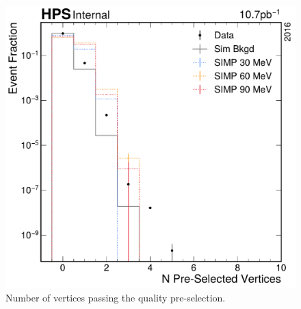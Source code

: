\begin{figure}
  \centering
  \includegraphics[width=\textwidth]{figures/hps/dataset/n-pre-selected-vertices.pdf}
  \caption{Number of vertices passing the quality pre-selection.}
  \label{fig:n-vertex-pre-selection}
\end{figure}

